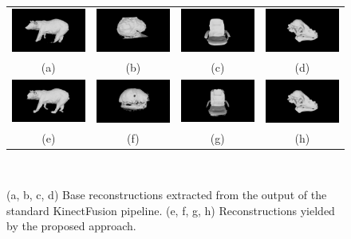 \begin{figure}[!htbp]
  \centering
  \begin{tabular}{cccc}
    \includegraphics[width=.2\linewidth]{figures/object_recon/comp/itm/bear00.png}&
		\includegraphics[width=.2\linewidth]{figures/object_recon/comp/itm/brain00.png}&
		\includegraphics[width=.2\linewidth]{figures/object_recon/comp/itm/chair00.png}&
    \includegraphics[width=.2\linewidth]{figures/object_recon/comp/itm/dino00.png} \\
    (a) & (b) & (c) & (d) \\
		\includegraphics[width=.2\linewidth]{figures/object_recon/comp/prob/bear00.png}&
		\includegraphics[width=.2\linewidth]{figures/object_recon/comp/prob/brain00.png}&
		\includegraphics[width=.2\linewidth]{figures/object_recon/comp/prob/chair00.png}&
    \includegraphics[width=.2\linewidth]{figures/object_recon/comp/itm/dino00.png} \\
    (e) & (f) & (g) & (h) \\
  \end{tabular}
  \caption[Probabilistic Object Reconstruction Qualitative Results III]
  {(a, b, c, d) Base reconstructions extracted from the output of the 
  standard KinectFusion pipeline. (e, f, g, h) Reconstructions yielded by 
  the proposed approach.}
~\label{figure:probobj_comp_itm}
\end{figure}

